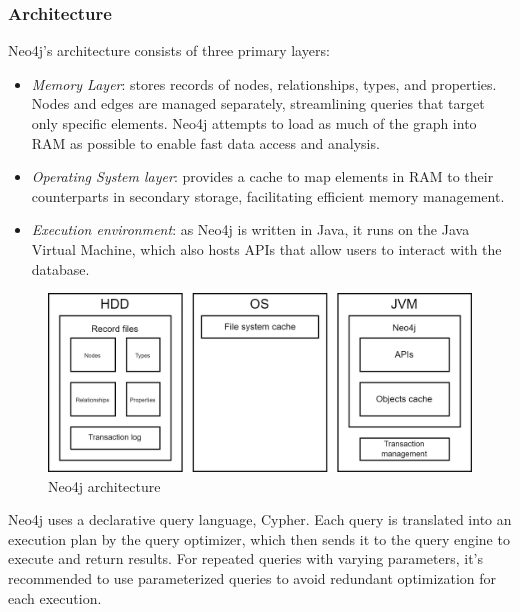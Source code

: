 \subsubsection{Architecture}
Neo4j's architecture consists of three primary layers:
\begin{itemize}
    \item \textit{Memory Layer}: stores records of nodes, relationships, types, and properties. 
        Nodes and edges are managed separately, streamlining queries that target only specific elements. 
        Neo4j attempts to load as much of the graph into RAM as possible to enable fast data access and analysis.
    \item \textit{Operating System layer}: provides a cache to map elements in RAM to their counterparts in secondary storage, facilitating efficient memory management.
    \item \textit{Execution environment}: as Neo4j is written in Java, it runs on the Java Virtual Machine, which also hosts APIs that allow users to interact with the database.
\end{itemize}
\begin{figure}[H]
    \centering
    \includegraphics[width=0.65\linewidth]{images/neo4j.png}
    \caption{Neo4j architecture}
\end{figure}
Neo4j uses a declarative query language, Cypher. 
Each query is translated into an execution plan by the query optimizer, which then sends it to the query engine to execute and return results. 
For repeated queries with varying parameters, it's recommended to use parameterized queries to avoid redundant optimization for each execution.

